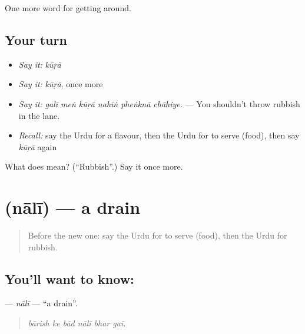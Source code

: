 \begin{grammarlens}[title={What you've built}]
One more word for getting around.
\end{grammarlens}

\subsection*{Your turn}
\begin{itemize}
\raggedright
  \item \emph{Say it:} \emph{kūṛā}
  \item \emph{Say it:} \emph{kūṛā}, once more
  \item \emph{Say it:} \emph{galī meṅ kūṛā nahīṅ pheṅknā chāhiye.} — You shouldn't throw rubbish in the lane.
  \item \emph{Recall:} say the Urdu for a flavour, then the Urdu for to serve (food), then say \emph{kūṛā} again
\end{itemize}

\begin{tcolorbox}[breakable,colback=teal!4,colframe=teal!35!black,title={Before you move on}]
What does  mean? (\textquotedblleft{}Rubbish\textquotedblright{}.) Say it once more.
\end{tcolorbox}
\section[\texorpdfstring{\ur{نالی} (nālī)}{نالی (nālī)}]{ (nālī) — a drain}

\label{lesson:UR-C416-nali}



\begin{quote}
Before the new one: say the Urdu for to serve (food), then the Urdu for rubbish.
\end{quote}

\subsection*{You'll want to know: }
\textbf{} — \emph{nālī} — \textquotedblleft{}a drain\textquotedblright{}.

\begin{quote}
     
\end{quote}

\begin{quote}
\emph{bārish ke bād nālī bhar gaī.}
\end{quote}

